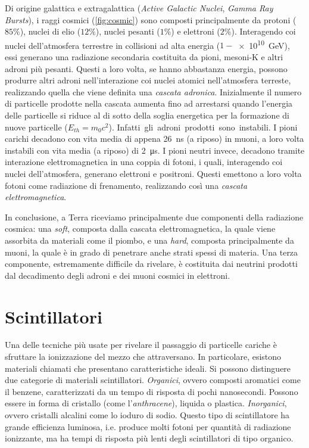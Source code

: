 \documentclass[../main.tex]{subfiles}
\begin{document}
Di origine galattica e extragalattica (\emph{Active Galactic Nuclei}, \emph{Gamma Ray Bursts}), i raggi cosmici (\autoref{fig:cosmic}) sono composti principalmente da protoni ($85\%$), nuclei di elio ($12\%$), nuclei pesanti ($1\%$) e elettroni ($2\%$). Interagendo coi nuclei dell'atmosfera terrestre in collisioni ad alta energia ($1 -$\SI{e10}{\GeV}), essi generano una radiazione secondaria costituita da pioni, mesoni-K e altri adroni più pesanti. Questi a loro volta, se hanno abbastanza energia, possono produrre altri adroni nell'interazione coi nuclei atomici nell'atmosfera terreste, realizzando quella che viene definita una \emph{cascata adronica}. 
Inizialmente il numero di particelle prodotte nella cascata aumenta fino ad arrestarsi quando l'energia delle particelle si riduce al di sotto della soglia energetica per la formazione di nuove particelle ($E_{th} = m_{0}c^2$).
\mbox{Infatti gli adroni prodotti sono instabili.} I pioni carichi decadono con vita media di appena \SI{26}{\ns} (a riposo) in muoni, a loro volta instabili con vita media (a riposo) di \SI{2}{\micro\s}. I pioni neutri invece, decadono tramite interazione elettromagnetica in una coppia di fotoni, i quali, interagendo coi nuclei dell'atmosfera, generano elettroni e positroni. Questi emettono a loro volta fotoni come radiazione di frenamento, realizzando così una \emph{cascata elettromagnetica}.


In conclusione, a Terra riceviamo principalmente due componenti della radiazione cosmica: una \emph{soft}, composta dalla cascata elettromagnetica, la quale viene assorbita da materiali come il piombo, e una \emph{hard}, composta principalmente da muoni, la quale è in grado di penetrare anche strati spessi di materia. 
Una terza componente, estremamente difficile da rivelare, è costituita dai neutrini prodotti dal decadimento degli adroni e dei muoni cosmici in elettroni.

\section{Scintillatori}
Una delle tecniche più usate per rivelare il passaggio di particelle cariche è sfruttare la ionizzazione del mezzo che attraversano. In particolare, esistono materiali chiamati  che presentano caratteristiche ideali. 
Si possono distinguere due categorie di materiali scintillatori.
\emph{Organici}, ovvero composti aromatici come il benzene, caratterizzati da un tempo di risposta di pochi nanosecondi. Possono essere in forma di cristallo (come l'\emph{anthracene}), liquida o plastica. \emph{Inorganici}, ovvero cristalli alcalini come lo ioduro di sodio. Questo tipo di scintillatore ha grande efficienza luminosa, i.e. produce molti fotoni per quantità di radiazione ionizzante, ma ha tempi di risposta più lenti degli scintillatori di tipo organico.
\end{document}
